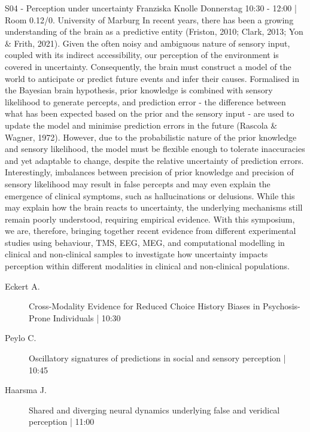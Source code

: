 
            \begin{symposium}
            {S04 - Perception under uncertainty}
            { Franziska Knolle}
            {Donnerstag 10:30 - 12:00 | Room 0.12/0.}
            {University of Marburg }
            In recent years, there has been a growing understanding of the brain as a predictive entity (Friston, 2010; Clark, 2013; Yon \& Frith, 2021). Given the often noisy and ambiguous nature of sensory input, coupled with its indirect accessibility, our perception of the environment is covered in uncertainty. Consequently, the brain must construct a model of the world to anticipate or predict future events and infer their causes. Formalised in the Bayesian brain hypothesis, prior knowledge is combined with sensory likelihood to generate percepts, and prediction error - the difference between what has been expected based on the prior and the sensory input - are used to update the model and minimise prediction errors in the future (Rascola \& Wagner, 1972). However, due to the probabilistic nature of the prior knowledge and sensory likelihood, the model must be flexible enough to tolerate inaccuracies and yet adaptable to change, despite the relative uncertainty of prediction errors. Interestingly, imbalances between precision of prior knowledge and precision of sensory likelihood may result in false percepts and may even explain the emergence of clinical symptoms, such as hallucinations or delusions. While this may explain how the brain reacts to uncertainty, the underlying mechanisms still remain poorly understood, requiring empirical evidence.
With this symposium, we are, therefore, bringing together recent evidence from different experimental studies using behaviour, TMS, EEG, MEG, and computational modelling in clinical and non-clinical samples to investigate how uncertainty impacts perception within different modalities in clinical and non-clinical populations.
            \begin{description}    
            
                \item [ Eckert A.] Cross-Modality Evidence for Reduced Choice History Biases in Psychosis-Prone Individuals  \textcolor{mygray}{ | 10:30}    
                
                \item [ Peylo C.] Oscillatory signatures of predictions in social and sensory perception  \textcolor{mygray}{ | 10:45}    
                
                \item [ Haarsma J.] Shared and diverging neural dynamics underlying false and veridical perception  \textcolor{mygray}{ | 11:00}    
                

\end{description}
\end{symposium}
